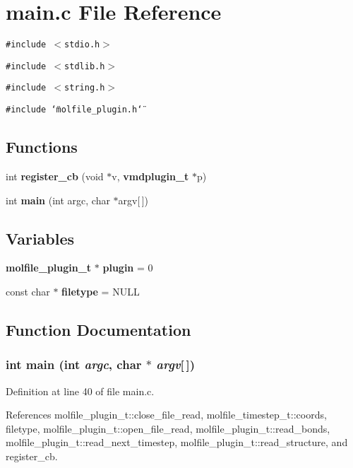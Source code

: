 \section{main.c File Reference}
\label{main_8c}
{\tt \#include $<$stdio.h$>$}\par
{\tt \#include $<$stdlib.h$>$}\par
{\tt \#include $<$string.h$>$}\par
{\tt \#include \char`\"{}molfile\_\-plugin.h\char`\"{}}\par
\subsection*{Functions}
\begin{CompactItemize}
\item 
int {\bf register\_\-cb} (void $\ast$v, {\bf vmdplugin\_\-t} $\ast$p)
\item 
int {\bf main} (int argc, char $\ast$argv[$\,$])
\end{CompactItemize}
\subsection*{Variables}
\begin{CompactItemize}
\item 
{\bf molfile\_\-plugin\_\-t} $\ast$ {\bf plugin} = 0
\item 
const char $\ast$ {\bf filetype} = NULL
\end{CompactItemize}


\subsection{Function Documentation}
\subsubsection{\setlength{\rightskip}{0pt plus 5cm}int main (int {\em argc}, char $\ast$ {\em argv}[$\,$])}\label{main_8c_a3}




Definition at line 40 of file main.c.

References molfile\_\-plugin\_\-t::close\_\-file\_\-read, molfile\_\-timestep\_\-t::coords, filetype, molfile\_\-plugin\_\-t::open\_\-file\_\-read, molfile\_\-plugin\_\-t::read\_\-bonds, molfile\_\-plugin\_\-t::read\_\-next\_\-timestep, molfile\_\-plugin\_\-t::read\_\-structure, and register\_\-cb.
